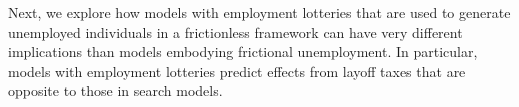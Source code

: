 
Next, we explore how models with employment lotteries that are
used to generate unemployed individuals in a frictionless framework
can have very different implications than models embodying
frictional unemployment. In particular,
models with employment  lotteries predict effects from layoff
taxes that are
opposite to those in search models.